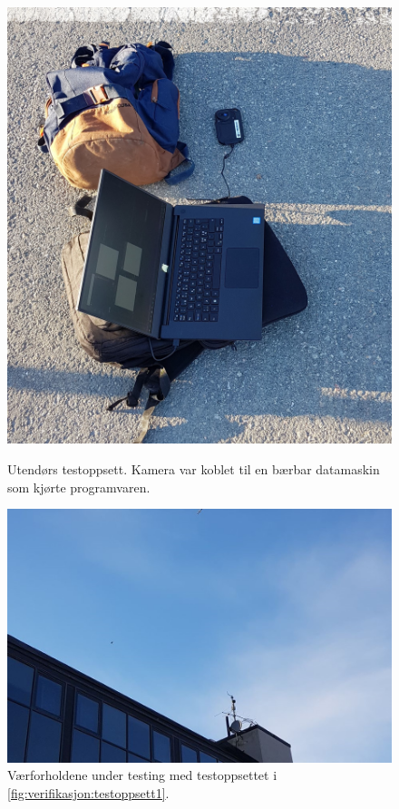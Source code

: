 \begin{figure}[H]
    \centering
    \begin{minipage}{0.45\textwidth}
        \centering
        \includegraphics[width=1\textwidth]{verifikasjon-test/Testoppsett/Testoppsett5.jpg}
        \caption{Utendørs testoppsett. Kamera var koblet til en bærbar datamaskin som kjørte programvaren.}
        \label{fig:verifikasjon:testoppsett1}
    \end{minipage}\hfill
    \begin{minipage}{0.45\textwidth}
        \centering
        \includegraphics[width=1\textwidth]{verifikasjon-test/Testoppsett/Testoppsett6.jpg}
        \caption{Værforholdene under testing med testoppsettet i \autoref{fig:verifikasjon:testoppsett1}.}
        \label{fig:verifikasjon:værTest1}
    \end{minipage}
\end{figure}

